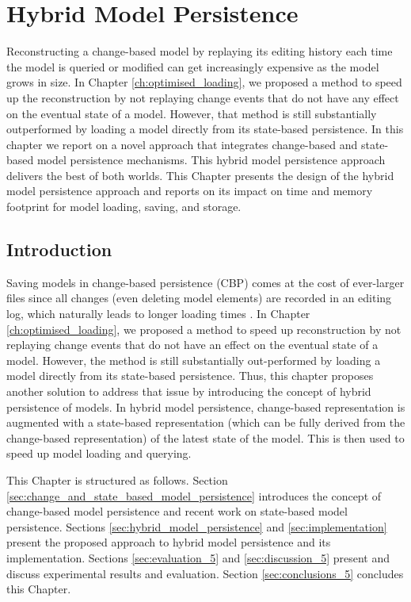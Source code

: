 \chapter{Hybrid Model Persistence}
\label{ch:hybrid_model_persistence}

Reconstructing a change-based model by replaying its editing history each time the model is queried or modified can get increasingly expensive as the model grows in size. In Chapter \ref{ch:optimised_loading}, we proposed a method to speed up the reconstruction by not replaying change events that do not have any effect on the eventual state of a model. However, that method is still substantially outperformed by loading a model directly from its state-based persistence. In this chapter we report on a novel approach that integrates change-based and state-based model persistence mechanisms. This hybrid model persistence approach delivers the best of both worlds. This Chapter presents the design of the hybrid model persistence approach and reports on its impact on time and memory footprint for model loading, saving, and storage.

\section{Introduction}
\label{sec:introduction_5}
Saving models in change-based persistence (CBP) comes at the cost of ever-larger files \cite{DBLP:conf/edoc/KoegelHLHD10,DBLP:journals/entcs/RobbesL07} since all changes (even deleting model elements) are recorded in an editing log, which naturally leads to longer loading times \cite{mens2002state}.
In Chapter \ref{ch:optimised_loading}, we proposed a method to speed up reconstruction by not replaying change events that do not have an effect on the eventual state of a model. However, the method is still substantially out-performed by loading a model directly from its state-based persistence. Thus, this chapter proposes another solution to address that issue by introducing the concept of hybrid persistence of models. In hybrid model persistence, change-based representation is augmented with a state-based representation (which can be fully derived from the change-based representation) of the latest state of the model. This is then used to speed up model loading and querying.

This Chapter is structured as follows. Section \ref{sec:change_and_state_based_model_persistence} introduces the concept of change-based model persistence and recent work on state-based model persistence. Sections \ref{sec:hybrid_model_persistence} and \ref{sec:implementation} present the proposed approach to hybrid model persistence and its implementation. Sections \ref{sec:evaluation_5} and \ref{sec:discussion_5} present and discuss experimental results and evaluation. Section \ref{sec:conclusions_5} concludes this Chapter.

